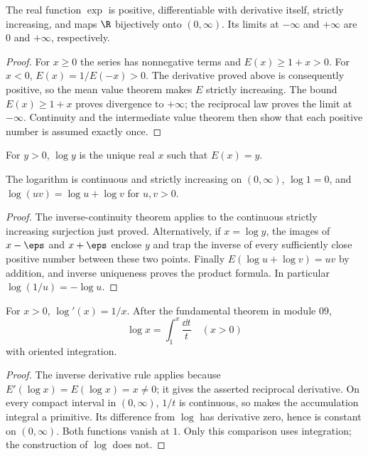 \begin{theorem}
The real function $\exp$ is positive, differentiable with derivative itself,
strictly increasing, and maps $\R$ bijectively onto $(0,\infty)$. Its limits
at $-\infty$ and $+\infty$ are $0$ and $+\infty$, respectively.
\end{theorem}
\begin{proof}
For $x\ge0$ the series has nonnegative terms and $E(x)\ge1+x>0$.
For $x<0$, $E(x)=1/E(-x)>0$. The derivative proved above is consequently
positive, so the mean value theorem makes $E$ strictly increasing.
The bound $E(x)\ge1+x$ proves divergence to $+\infty$; the reciprocal law
proves the limit at $-\infty$. Continuity and the intermediate value theorem
then show that each positive number is assumed exactly once.
\end{proof}

\begin{definition}
For $y>0$, $\log y$ is the unique real $x$ such that $E(x)=y$.
\end{definition}
\begin{proposition}
The logarithm is continuous and strictly increasing on $(0,\infty)$,
$\log1=0$, and $\log(uv)=\log u+\log v$ for $u,v>0$.
\end{proposition}
\begin{proof}
The inverse-continuity theorem  applies to
the continuous strictly increasing surjection just proved. Alternatively,
if $x=\log y$, the images of $x-\eps$ and $x+\eps$ enclose $y$ and trap
the inverse of every sufficiently close positive number between these two
points. Finally $E(\log u+\log v)=uv$ by addition, and inverse uniqueness
proves the product formula. In particular $\log(1/u)=-\log u$.
\end{proof}

\begin{theorem}
For $x>0$, $\log'(x)=1/x$. After the fundamental theorem in module 09,
\[\log x=\int_1^x\frac{\dd t}{t}\quad(x>0)
\]
with oriented integration.
\end{theorem}
\begin{proof}
The inverse derivative rule applies because $E'(\log x)=E(\log x)=x\ne0$;
it gives the asserted reciprocal derivative. On every compact interval in
$(0,\infty)$, $1/t$ is continuous, so  makes the
accumulation integral a primitive. Its difference from $\log$ has derivative
zero, hence is constant on $(0,\infty)$. Both functions vanish at $1$.
Only this comparison uses integration; the construction of $\log$ does not.
\end{proof}

